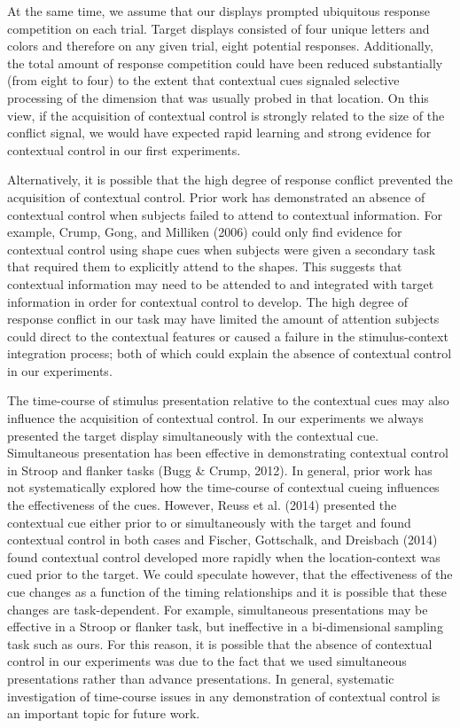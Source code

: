 \documentclass[english,,man,floatsintext]{apa6}
\begin{document}
At the same time, we assume that our displays prompted ubiquitous
response competition on each trial. Target displays consisted of four
unique letters and colors and therefore on any given trial, eight
potential responses. Additionally, the total amount of response
competition could have been reduced substantially (from eight to four)
to the extent that contextual cues signaled selective processing of the
dimension that was usually probed in that location. On this view, if the
acquisition of contextual control is strongly related to the size of the
conflict signal, we would have expected rapid learning and strong
evidence for contextual control in our first experiments.

Alternatively, it is possible that the high degree of response conflict
prevented the acquisition of contextual control. Prior work has
demonstrated an absence of contextual control when subjects failed to
attend to contextual information. For example, Crump, Gong, and Milliken
(2006) could only find evidence for contextual control using shape cues
when subjects were given a secondary task that required them to
explicitly attend to the shapes. This suggests that contextual
information may need to be attended to and integrated with target
information in order for contextual control to develop. The high degree
of response conflict in our task may have limited the amount of
attention subjects could direct to the contextual features or caused a
failure in the stimulus-context integration process; both of which could
explain the absence of contextual control in our experiments.

The time-course of stimulus presentation relative to the contextual cues
may also influence the acquisition of contextual control. In our
experiments we always presented the target display simultaneously with
the contextual cue. Simultaneous presentation has been effective in
demonstrating contextual control in Stroop and flanker tasks (Bugg \&
Crump, 2012). In general, prior work has not systematically explored how
the time-course of contextual cueing influences the effectiveness of the
cues. However, Reuss et al. (2014) presented the contextual cue either
prior to or simultaneously with the target and found contextual control
in both cases and Fischer, Gottschalk, and Dreisbach (2014) found
contextual control developed more rapidly when the location-context was
cued prior to the target. We could speculate however, that the
effectiveness of the cue changes as a function of the timing
relationships and it is possible that these changes are task-dependent.
For example, simultaneous presentations may be effective in a Stroop or
flanker task, but ineffective in a bi-dimensional sampling task such as
ours. For this reason, it is possible that the absence of contextual
control in our experiments was due to the fact that we used simultaneous
presentations rather than advance presentations. In general, systematic
investigation of time-course issues in any demonstration of contextual
control is an important topic for future work.
\end{document}
